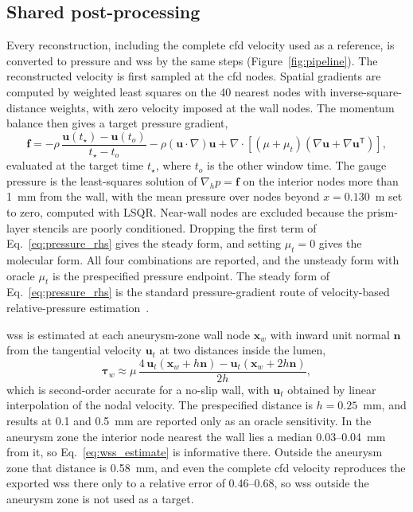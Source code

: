 \documentclass[12pt,a4paper]{article}
\newcommand{\CFD}{\ac{cfd}\xspace}
\newcommand{\WSS}{\ac{wss}\xspace}
\newcommand{\WSScap}{\Ac{wss}\xspace}
\theoremstyle{definition}
\numberwithin{equation}{section}
\begin{document}
\subsection{Shared post-processing}
\label{sec:postprocessing}
Every reconstruction, including the complete \CFD velocity used as a reference, is converted to pressure and \WSS by the same steps (Figure~\ref{fig:pipeline}). The reconstructed velocity is first sampled at the \CFD nodes. Spatial gradients are computed by weighted least squares on the 40 nearest nodes with inverse-square-distance weights, with zero velocity imposed at the wall nodes. The momentum balance then gives a target pressure gradient,
\begin{equation}
\mathbf f=-\rho\,\frac{\mathbf u(t_\star)-\mathbf u(t_o)}{t_\star-t_o}
-\rho(\mathbf u\cdot\nabla)\mathbf u
+\nabla\cdot\left[(\mu+\mu_t)(\nabla\mathbf u+\nabla\mathbf u^{\mathsf T})\right],
\label{eq:pressure_rhs}
\end{equation}
evaluated at the target time $t_\star$, where $t_o$ is the other window time. The gauge pressure is the least-squares solution of $\nabla_h p=\mathbf f$ on the interior nodes more than 1~mm from the wall, with the mean pressure over nodes beyond $x=0.130$~m set to zero, computed with LSQR. Near-wall nodes are excluded because the prism-layer stencils are poorly conditioned. Dropping the first term of Eq.~\eqref{eq:pressure_rhs} gives the steady form, and setting $\mu_t=0$ gives the molecular form. All four combinations are reported, and the unsteady form with oracle $\mu_t$ is the prespecified pressure endpoint. The steady form of Eq.~\eqref{eq:pressure_rhs} is the standard pressure-gradient route of velocity-based relative-pressure estimation~\cite{bertoglio2018relative}.

\WSScap is estimated at each aneurysm-zone wall node $\mathbf x_w$ with inward unit normal $\mathbf n$ from the tangential velocity $\mathbf u_t$ at two distances inside the lumen,
\begin{equation}
\boldsymbol\tau_w\approx\mu\,\frac{4\,\mathbf u_t(\mathbf x_w+h\mathbf n)-\mathbf u_t(\mathbf x_w+2h\mathbf n)}{2h},
\label{eq:wss_estimate}
\end{equation}
which is second-order accurate for a no-slip wall, with $\mathbf u_t$ obtained by linear interpolation of the nodal velocity. The prespecified distance is $h=0.25$~mm, and results at 0.1 and 0.5~mm are reported only as an oracle sensitivity. In the aneurysm zone the interior node nearest the wall lies a median 0.03--0.04~mm from it, so Eq.~\eqref{eq:wss_estimate} is informative there. Outside the aneurysm zone that distance is 0.58~mm, and even the complete \CFD velocity reproduces the exported \WSS there only to a relative error of 0.46--0.68, so \WSS outside the aneurysm zone is not used as a target.
\end{document}
